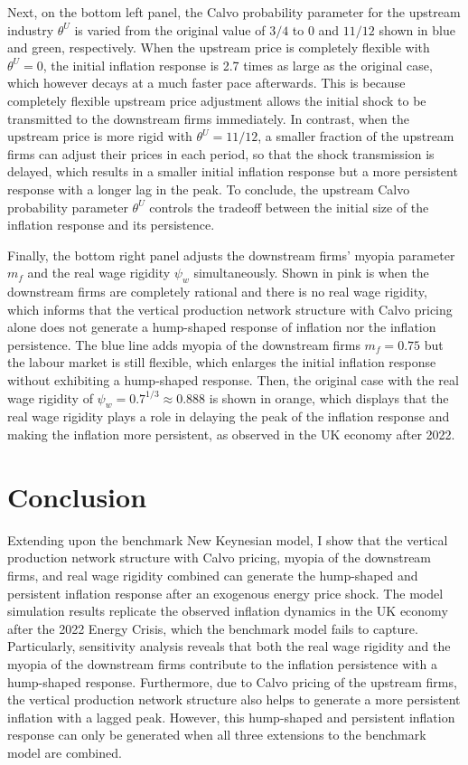 \documentclass[a4paper, 12pt]{article}
\theoremstyle{definition*}
\begin{document}
Next, on the bottom left panel, the Calvo probability parameter for the upstream industry $\theta^U$ is varied from the original value of $3/4$ to $0$ and $11/12$ shown in blue and green, respectively.
When the upstream price is completely flexible with $\theta^U = 0$, the initial inflation response is 2.7 times as large as the original case, which however decays at a much faster pace afterwards.
This is because completely flexible upstream price adjustment allows the initial shock to be transmitted to the downstream firms immediately.
In contrast, when the upstream price is more rigid with $\theta^U = 11/12$, a smaller fraction of the upstream firms can adjust their prices in each period, so that the shock transmission is delayed, which results in a smaller initial inflation response but a more persistent response with a longer lag in the peak.
To conclude, the upstream Calvo probability parameter $\theta^U$ controls the tradeoff between the initial size of the inflation response and its persistence.

Finally, the bottom right panel adjusts the downstream firms' myopia parameter $m_f$ and the real wage rigidity $\psi_w$ simultaneously.
Shown in pink is when the downstream firms are completely rational and there is no real wage rigidity, which informs that the vertical production network structure with Calvo pricing alone does not generate a hump-shaped response of inflation nor the inflation persistence.
The blue line adds myopia of the downstream firms $m_f = 0.75$ but the labour market is still flexible, which enlarges the initial inflation response without exhibiting a hump-shaped response.
Then, the original case with the real wage rigidity of $\psi_w = 0.7^{1/3} \approx 0.888$ is shown in orange, which displays that the real wage rigidity plays a role in delaying the peak of the inflation response and making the inflation more persistent, as observed in the UK economy after 2022.

\section{Conclusion}\label{sec:conclusion}
Extending upon the benchmark New Keynesian model, I show that the vertical production network structure with Calvo pricing, myopia of the downstream firms, and real wage rigidity combined can generate the hump-shaped and persistent inflation response after an exogenous energy price shock.
The model simulation results replicate the observed inflation dynamics in the UK economy after the 2022 Energy Crisis, which the benchmark model fails to capture.
Particularly, sensitivity analysis reveals that both the real wage rigidity and the myopia of the downstream firms contribute to the inflation persistence with a hump-shaped response.
Furthermore, due to Calvo pricing of the upstream firms, the vertical production network structure also helps to generate a more persistent inflation with a lagged peak.
However, this hump-shaped and persistent inflation response can only be generated when all three extensions to the benchmark model are combined.
\end{document}
